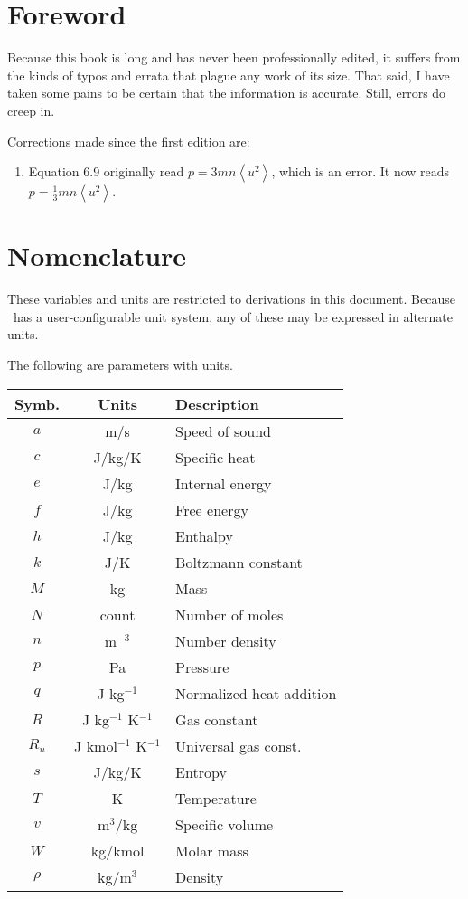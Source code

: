 \section*{Foreword}

Because this book is long and has never been professionally edited, it suffers from the kinds of typos and errata that plague any work of its size.  That said, I have taken some pains to be certain that the information is accurate.  Still, errors do creep in.

Corrections made since the first edition are:
\begin{enumerate}
\item Equation 6.9 originally read $p=3mn\left<u^2\right>$, which is an error. It now reads $p=\frac{1}{3}mn\left<u^2\right>$.
\end{enumerate}

\section*{Nomenclature}

These variables and units are restricted to derivations in this document.  Because \PM\ has a user-configurable unit system, any of these may be expressed in alternate units.  

The following are parameters with units.

\vspace{1em}
\begin{tabular}{|ccl|}
\hline
Symb. & Units & Description\\
\hline
$a$ & m/s & Speed of sound\\
$c$ & J/kg/K & Specific heat\\
$e$ & J/kg & Internal energy\\
$f$ & J/kg & Free energy\\
$h$ & J/kg & Enthalpy\\
$k$ & J/K & Boltzmann constant\\
$M$ & kg & Mass\\
$N$ & count & Number of moles\\
$n$ & m$^{-3}$ & Number density\\
$p$ & Pa & Pressure\\
$q$ & J kg$^{-1}$ & Normalized heat addition\\
$R$ & J kg$^{-1}$ K$^{-1}$ & Gas constant\\
$R_u$ & J kmol$^{-1}$ K$^{-1}$ & Universal gas const.\\
$s$ & J/kg/K & Entropy\\
$T$ & K & Temperature\\
$v$ & m$^3$/kg & Specific volume\\
$W$ & kg/kmol & Molar mass\\
$\rho$ & kg/m$^3$ & Density\\
\hline
\end{tabular}
\vspace{1em}

